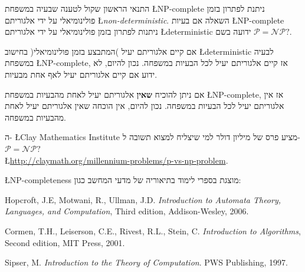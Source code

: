 \documentclass[12pt,a4paper]{article}
\begin{document}
התנאי הראשון שקול לטענה שבעיה במשפחת
\L{NP-complete}
ניתנת לפתרון בזמן פולינומיאלי על ידי אלגוריתם
\L{\emph{non-deterministic}}.
השאלה אם בעיות 
\L{NP-complete}
ניתנות לפתרון בזמן פולינומיאלי על ידי אלגוריתם
\L{deterministic}
ידועה בשם
$\mathcal{P}=\mathcal{NP}?$.

אם קיים אלגוריתם יעיל )המתבצע בזמן פולינומיאלי( בחישוב
\L{deterministic}
לבעיה במשפחת
\L{NP-complete},
אז קיים אלגוריתם יעיל לכל הבעיות במשפחה. נכון להיום, לא ידוע אם קיים אלגוריתם יעיל לאף אחת מבעיות.

אם ניתן להוכיח 
\textbf{שאין}
אלגוריתם יעיל לאחת מהבעיות במשפחת
\L{NP-complete},
אז אין אלגוריתם יעיל לכל הבעיות במשפחה. נכון להיום, אין הוכחה שאין אלגוריתם יעיל לאחת מהבעיות במשפחה.


ה-%
\L{Clay Mathematics Institute}
מציע פרס של מיליון דולר למי שיצליח למצוא תשובה ל-%
$\mathcal{P}=\mathcal{NP}?$\\
\L{\url{http://claymath.org/millennium-problems/p-vs-np-problem}}.

\L{NP-completeness}
מוצגת בספרי לימוד בתיאוריה של מדעי המחשב כגון:

Hopcroft, J.E, Motwani, R., Ullman, J.D. \textit{Introduction to Automata Theory, Languages, and Computation}, Third edition,  Addison-Wesley, 2006.

Cormen, T.H., Leiserson, C.E., Rivest, R.L., Stein, C. \textit{Introduction to Algorithms}, Second edition, MIT Press, 2001.

Sipser, M. \textit{Introduction to the Theory of Computation}. PWS Publishing, 1997.
\end{document}
